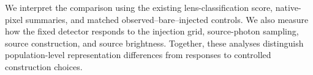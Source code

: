 We interpret the comparison using the existing lens-classification score,
native-pixel summaries, and matched observed--bare--injected controls.
We also measure how the fixed detector responds to the injection grid,
source-photon sampling, source construction, and source brightness. Together,
these analyses distinguish
population-level representation differences from responses to controlled
construction choices.

